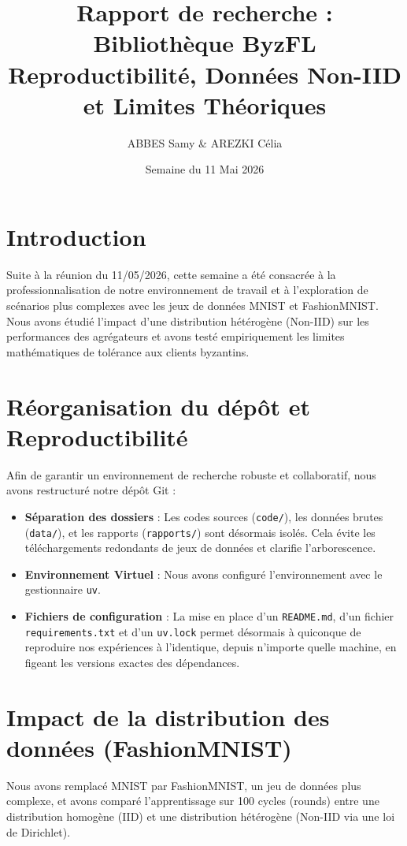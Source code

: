\documentclass[11pt, a4paper]{article}
\title{\textbf{Rapport de recherche : Bibliothèque ByzFL} \\ \large Reproductibilité, Données Non-IID et Limites Théoriques}
\author{ABBES Samy \& AREZKI Célia}
\date{Semaine du 11 Mai 2026}
\begin{document}
\maketitle

\section{Introduction}
Suite à la réunion du 11/05/2026, cette semaine a été consacrée à la professionnalisation de notre environnement de travail et à l'exploration de scénarios plus complexes avec les jeux de données MNIST et FashionMNIST. Nous avons étudié l'impact d'une distribution hétérogène (Non-IID) sur les performances des agrégateurs et avons testé empiriquement les limites mathématiques de tolérance aux clients byzantins.

\section{Réorganisation du dépôt et Reproductibilité}
Afin de garantir un environnement de recherche robuste et collaboratif, nous avons restructuré notre dépôt Git :
\begin{itemize}
    \item \textbf{Séparation des dossiers} : Les codes sources (\texttt{code/}), les données brutes (\texttt{data/}), et les rapports (\texttt{rapports/}) sont désormais isolés. Cela évite les téléchargements redondants de jeux de données et clarifie l'arborescence.
    \item \textbf{Environnement Virtuel} : Nous avons configuré l'environnement avec le gestionnaire \texttt{uv}.
    \item \textbf{Fichiers de configuration} : La mise en place d'un \texttt{README.md}, d'un fichier \texttt{requirements.txt} et d'un \texttt{uv.lock} permet désormais à quiconque de reproduire nos expériences à l'identique, depuis n'importe quelle machine, en figeant les versions exactes des dépendances.
\end{itemize}

\section{Impact de la distribution des données (FashionMNIST)}
Nous avons remplacé MNIST par FashionMNIST, un jeu de données plus complexe, et avons comparé l'apprentissage sur 100 cycles (rounds) entre une distribution homogène (IID) et une distribution hétérogène (Non-IID via une loi de Dirichlet).
\end{document}
